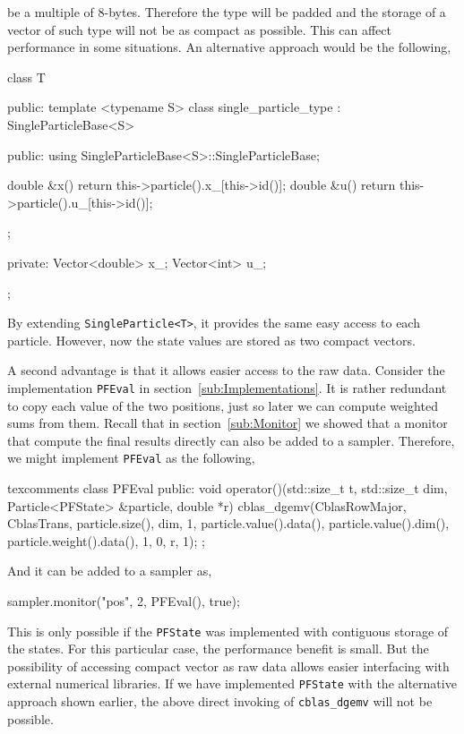be a multiple of 8-bytes. Therefore the type will be padded and the storage of
a vector of such type will not be as compact as possible. This can affect
performance in some situations. An alternative approach would be the following,
\begin{cppcode}
  class T
  {
      public:
      template <typename S>
      class single_particle_type : SingleParticleBase<S>
      {
          public:
          using SingleParticleBase<S>::SingleParticleBase;

          double &x() { return this->particle().x_[this->id()]; }
          double &u() { return this->particle().u_[this->id()]; }
      };

      private:
      Vector<double> x_;
      Vector<int> u_;
  };
\end{cppcode}
By extending \verb|SingleParticle<T>|, it provides the same easy access to each
particle. However, now the state values are stored as two compact vectors.

A second advantage is that it allows easier access to the raw data. Consider
the implementation \verb|PFEval| in section~\ref{sub:Implementations}. It is
rather redundant to copy each value of the two positions, just so later we can
compute weighted sums from them. Recall that in section~\ref{sub:Monitor} we
showed that a monitor that compute the final results directly can also be added
to a sampler. Therefore, we might implement \verb|PFEval| as the following,
\begin{cppcode*}{texcomments}
  class PFEval
  {
      public:
      void operator()(std::size_t t, std::size_t dim,
          Particle<PFState> &particle, double *r)
      {
          cblas_dgemv(CblasRowMajor, CblasTrans, particle.size(), dim, 1,
              particle.value().data(), particle.value().dim(),
              particle.weight().data(), 1, 0, r, 1);
      }
  };
\end{cppcode*}
And it can be added to a sampler as,
\begin{cppcode}
  sampler.monitor("pos", 2, PFEval(), true);
\end{cppcode}
This is only possible if the \verb|PFState| was implemented with contiguous
storage of the states. For this particular case, the performance benefit is
small. But the possibility of accessing compact vector as raw data allows
easier interfacing with external numerical libraries. If we have implemented
\verb|PFState| with the alternative approach shown earlier, the above direct
invoking of \verb|cblas_dgemv| will not be possible.
